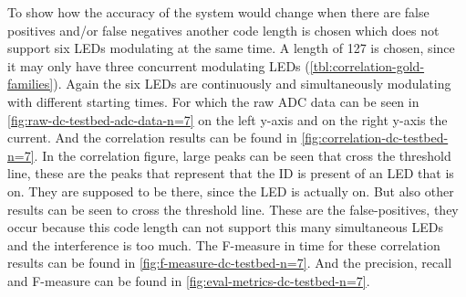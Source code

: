 To show how the accuracy of the system would change when there are false positives and/or false negatives another code length is chosen which does not support six LEDs modulating at the same time.
A length of 127 is chosen, since it may only have three concurrent modulating LEDs (\autoref{tbl:correlation-gold-families}).
Again the six LEDs are continuously and simultaneously modulating with different starting times.
For which the raw ADC data can be seen in \autoref{fig:raw-dc-testbed-adc-data-n=7} on the left y-axis and on the right y-axis the current.
And the correlation results can be found in \autoref{fig:correlation-dc-testbed-n=7}.
In the correlation figure, large peaks can be seen that cross the threshold line, these are the peaks that represent that the ID is present of an LED that is on.
They are supposed to be there, since the LED is actually on.
But also other results can be seen to cross the threshold line.
These are the false-positives, they occur because this code length can not support this many simultaneous LEDs and the interference is too much.
The F-measure in time for these correlation results can be found in \autoref{fig:f-measure-dc-testbed-n=7}.
And the precision, recall and F-measure can be found in \autoref{fig:eval-metrics-dc-testbed-n=7}.






